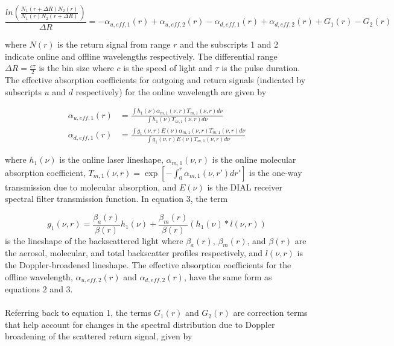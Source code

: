 \documentclass[twoside]{article}
\begin{document}
\begin{equation}
	\frac{ln\left(\frac{N_1(r+\Delta R) N_2(r)}{N_1(r) N_2(r+\Delta R)}\right)}{\Delta R} = -\alpha_{u,eff,1}(r) + \alpha_{u,eff,2}(r) -\alpha_{d,eff,1}(r) +\alpha_{d,eff,2}(r) + G_1(r) - G_2(r)
\end{equation}

\noindent where $N(r)$ is the return signal from range $r$ and the subscripts 1 and 2 indicate online and offline wavelengths respectively. 
The differential range $\Delta R = \frac{c \tau}{2}$ is the bin size where $c$ is the speed of light and $\tau$ is the pulse duration. 
The effective absorption coefficients for outgoing and return signals (indicated by subscripts $u$ and $d$ respectively) for the online wavelength are given by

\begin{align}
	\alpha_{u,eff,1}(r) &= \frac{\int h_1(\nu) \alpha_{m,1}(\nu,r) T_{m,1}(\nu,r) d\nu}{\int h_1(\nu) T_{m,1}(\nu,r) d\nu}\\
	\alpha_{d,eff,1}(r) &= \frac{\int g_1(\nu,r) E(\nu) \alpha_{m,1}(\nu,r) T_{m,1}(\nu,r) d\nu}{\int g_1(\nu,r) E(\nu) T_{m,1}(\nu,r) d\nu}
\end{align}

\noindent where $h_1(\nu)$ is the online laser lineshape, $\alpha_{m,1}(\nu,r)$ is the online molecular absorption coefficient, $T_{m,1}(\nu,r) = \exp\left[-\int^r_0 \alpha_{m,1}(\nu,r')dr'\right]$ is the one-way transmission due to molecular absorption, and $E(\nu)$ is the DIAL receiver spectral filter transmission function. 
In equation 3, the term

\begin{equation}
	g_1(\nu,r) = \frac{\beta_a(r)}{\beta(r)} h_{1}(\nu) + \frac{\beta_m(r)}{\beta(r)} (h_{1}(\nu)\ast l(\nu,r))
\end{equation}
\noindent is the lineshape of the backscattered light where $\beta_a(r)$, $\beta_m(r)$, and $\beta(r)$ are the aerosol, molecular, and total backscatter profiles respectively, and $l(\nu,r)$ is the Doppler-broadened lineshape. 
The effective absorption coefficients for the offline wavelength, $\alpha_{u,eff,2}(r)$ and $\alpha_{d,eff,2}(r)$, have the same form as equations 2 and 3.\\
\\
Referring back to equation 1, the terms $G_1(r)$ and $G_2(r)$ are correction terms that help account for changes in the spectral distribution due to Doppler broadening of the scattered return signal, given by
\end{document}
